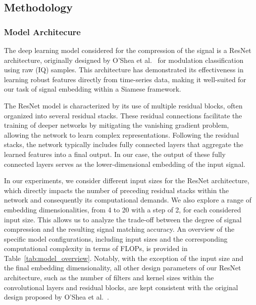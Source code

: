 \documentclass[sigconf, 10pt, nonacm, anonymous]{acmart}  %
\begin{document}
\subsection{Methodology}
\subsubsection{Model Architecure}
The deep learning model considered for the compression of the signal is a ResNet architecture, originally designed by O’Shea et al.~\cite{oshea} for modulation classification using raw (IQ) samples. This architecture has demonstrated its effectiveness in learning robust features directly from time-series data, making it well-suited for our task of signal embedding within a Siamese framework.

The ResNet model is characterized by its use of multiple residual blocks, often organized into several residual stacks. These residual connections facilitate the training of deeper networks by mitigating the vanishing gradient problem, allowing the network to learn complex representations. Following the residual stacks, the network typically includes fully connected layers that aggregate the learned features into a final output. In our case, the output of these fully connected layers serves as the lower-dimensional embedding of the input signal.

In our experiments, we consider different input sizes for the ResNet architecture, which directly impacts the number of preceding residual stacks within the network and consequently its computational demands. We also explore a range of embedding dimensionalities, from 4 to 20 with a step of 2, for each considered input size. This allows us to analyze the trade-off between the degree of signal compression and the resulting signal matching accuracy. An overview of the specific model configurations, including input sizes and the corresponding computational complexity in terms of FLOPs, is provided in Table~\ref{tab:model_overview}. Notably, with the exception of the input size and the final embedding dimensionality, all other design parameters of our ResNet architecture, such as the number of filters and kernel sizes within the convolutional layers and residual blocks, are kept consistent with the original design proposed by O’Shea et al.~\cite{oshea}.
\end{document}
